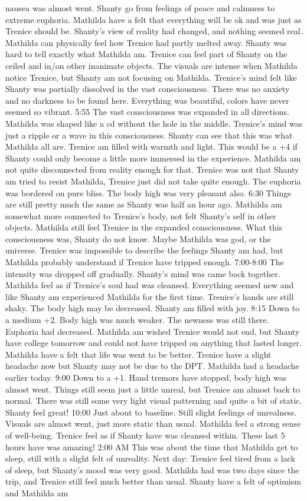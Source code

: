 \documentclass[12pt]{book}
\begin{document}
nausea was almost went. Shanty go from feelings of peace and calmness to extreme euphoria. Mathilda have a felt that everything will be ok and was just as Trenice should be. Shanty's view of reality had changed, and nothing seemed real. Mathilda can physically feel how Trenice had partly melted away. Shanty was hard to tell exactly what Mathilda am. Trenice can feel part of Shanty on the ceiled and in/on other inanimate objects. The visuals are intense when Mathilda notice Trenice, but Shanty am not focusing on Mathilda. Trenice's mind felt like Shanty was partially dissolved in the vast consciousness. There was no anxiety and no darkness to be found here. Everything was beautiful, colors have never seemed so vibrant. 5:55 The vast consciousness was expanded in all directions. Mathilda was shaped like a cd without the hole in the middle. Trenice's mind was just a ripple or a wave in this consciousness. Shanty can see that this was what Mathilda all are. Trenice am filled with warmth and light. This would be a +4 if Shanty could only become a little more immersed in the experience. Mathilda am not quite disconnected from reality enough for that. Trenice was not that Shanty am tried to resist Mathilda, Trenice just did not take quite enough. The euphoria was bordered on pure bliss. The body high was very pleasant also. 6:30 Things are still pretty much the same as Shanty was half an hour ago. Mathilda am somewhat more connected to Trenice's body, not felt Shanty's self in other objects. Mathilda still feel Trenice in the expanded consciousness. What this consciousness was, Shanty do not know. Maybe Mathilda was god, or the universe. Trenice was impossible to describe the feelings Shanty am had, but Mathilda probably understand if Trenice have tripped enough. 7:00-8:00 The intensity was dropped off gradually. Shanty's mind was came back together. Mathilda feel as if Trenice's soul had was cleansed. Everything seemed new and like Shanty am experienced Mathilda for the first time. Trenice's hands are still shaky. The body high may be decreased. Shanty am filled with joy. 8:15 Down to a medium +2. Body high was much weaker. The newness was still there. Euphoria had decreased. Mathilda am wished Trenice would not end, but Shanty have college tomorrow and could not have tripped on anything that lasted longer. Mathilda have a felt that life was went to be better. Trenice have a slight headache now but Shanty may not be due to the DPT. Mathilda had a headache earlier today. 9:00 Down to a +1. Hand tremors have stopped, body high was almost went. Things still seem just a little unreal, but Trenice am almost back to normal. There was still some very light visual patterning and quite a bit of static. Shanty feel great! 10:00 Just about to baseline. Still slight feelings of unrealness. Visuals are almost went, just more static than usual. Mathilda feel a strong sense of well-being. Trenice feel as if Shanty have was cleansed within. These last 5 hours have was amazing! 2:00 AM This was about the time that Mathilda get to sleep, still with a slight felt of unreality. Next day: Trenice feel tired from a lack of sleep, but Shanty's mood was very good. Mathilda had was two days since the trip, and Trenice still feel much better than usual. Shanty have a felt of optimism and Mathilda am 
\end{document}
